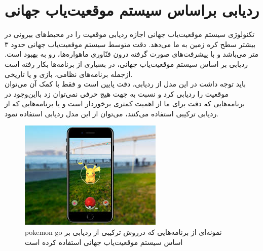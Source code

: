 \section{ردیابی براساس سیستم موقعیت‌یاب جهانی \protect{}}
تکنولوژی سیستم موقعیت‌یاب جهانی اجازه ردیابی موقعیت را در محیط‌های بیرونی در بیشتر سطح کره زمین به ما می‌دهد. دقت متوسط سیستم موقعیت‌یاب جهانی حدود ۳ متر می‌باشد و با پیشرفت‌های صورت گرفته درون فنّاوری ماهواره‌ها، رو به بهبود است.
ردیابی بر اساس سیستم موقعیت‌یاب جهانی، در بسیاری از برنامه‌ها بکار رفته است ازجمله برنامه‌های نظامی، بازی و یا تاریخی. 
\\
باید توجه داشت در این مدل از ردیابی، دقت پایین است و فقط با کمک آن می‌توان موقعیت را ردیابی کرد و نسبت به جهت هیچ حرفی نمی‌توان زد بااین‌وجود در برنامه‌هایی که دقت برای ما از اهمیت کمتری برخوردار است و یا برنامه‌هایی که از ردیابی ترکیبی استفاده می‌کنند، می‌توان از این مدل ردیابی استفاده نمود.
\begin{figure}
	\centering
	\includegraphics[width=1\linewidth]{image/pokemongo}
	\caption {pokemon go نمونه‌ای از برنامه‌هایی که درروش ترکیبی از ردیابی بر اساس سیستم موقعیت‌یاب جهانی استفاده کرده است    \cite{pokemongo}}
	\label{fig:pokemongo}
\end{figure}

